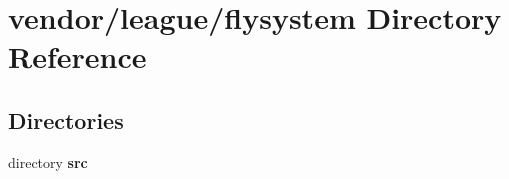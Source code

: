 \section{vendor/league/flysystem Directory Reference}
\label{dir_23000f69becca4a6611d63bb8e014bbb}
\subsection*{Directories}
\begin{DoxyCompactItemize}
\item 
directory {\bf src}
\end{DoxyCompactItemize}
